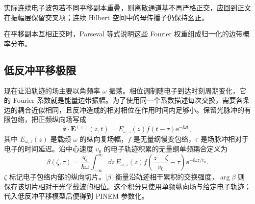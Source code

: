 实际连续电子波包若不同平移副本重叠，则离散通道基不再严格正交，应回到正文 在振幅层保留交叉项；连续 Hilbert 空间中的母传播子仍保持幺正。

在平移副本互相正交时，Parseval 等式说明这些 Fourier 权重组成归一化的边带概率分布。

\subsection{低反冲平移极限}

现在让沿轨迹的场主要以角频率 $\omega$ 振荡。相位调制随电子到达时刻周期变化，它的 Fourier 系数就是能量边带振幅。为了使用同一个系数描述每次交换，需要各条边的耦合近似相同，且反冲造成的相对相位在作用时间内足够小。保留光脉冲的有限包络，把正频纵向场写成
\begin{equation*}
\hat{\mathbf z}\cdot\mathbf E^{(+)}(z,t)
=E_{\omega,z}(z)f(t-\tau)\ee^{-\ii\omega t},
\end{equation*}
其中 $E_{\omega,z}(z)$ 是载频 $\omega$ 的纵向复场幅，$f$ 是无量纲慢变包络，$\tau$ 是场脉冲相对于电子的时间延迟。沿中心速度 $v_0$ 的电子轨迹积累的无量纲单频耦合定义为
\begin{equation}
\boxed{
\beta(\zeta,\tau)
=\frac{q_{\mathrm e}}{\hbar\omega}
\int_{-\infty}^{\infty}\dd z\,
E_{\omega,z}(z)
 f\!\left(\frac{z-\zeta}{v_0}-\tau\right)
\ee^{-\ii\omega z/v_0}.}
\label{eq:pinem_standard_beta_pulsed}
\end{equation}
$\zeta$ 标记电子包络内部的纵向切片。$|\beta|$ 衡量沿轨迹相干累积的交换强度，$\arg\beta$ 则保存该切片相对于光学载波的相位。这个积分只使用单频纵向场与给定电子轨迹；代入低反冲平移模型后便得到 PINEM 参数化。

